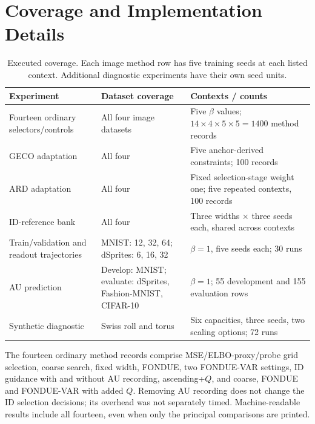\documentclass[make,article,submit,pdftex,moreauthors]{Definitions/mdpi}
\begin{document}
\section{Coverage and Implementation Details}\label{app:coverage}
\begin{table}[H]
\caption{Executed coverage. Each image method row has five training
seeds at each listed context. Additional diagnostic experiments have
their own seed units.}
\label{tab:coverage}\small
\begin{tabularx}{\textwidth}{lXX}\toprule
Experiment & Dataset coverage & Contexts / counts \\\midrule
Fourteen ordinary selectors/controls & All four image datasets & Five $\beta$ values; $14\times4\times5\times5=1400$ method records \\
GECO adaptation & All four & Five anchor-derived constraints; 100 records \\
ARD adaptation & All four & Fixed selection-stage weight one; five repeated contexts, 100 records \\
ID-reference bank & All four & Three widths $\times$ three seeds each, shared across contexts \\
Train/validation and readout trajectories & MNIST: 12, 32, 64; dSprites: 6, 16, 32 & $\beta=1$, five seeds each; 30 runs \\
AU prediction & Develop: MNIST; evaluate: dSprites, Fashion-MNIST, CIFAR-10 & $\beta=1$; 55 development and 155 evaluation rows \\
Synthetic diagnostic & Swiss roll and torus & Six capacities, three seeds, two scaling options; 72 runs \\
\bottomrule\end{tabularx}
\end{table}

The fourteen ordinary method records comprise MSE/ELBO-proxy/probe grid
selection, coarse search, fixed width, FONDUE, two FONDUE-VAR settings,
ID guidance with and without AU recording, ascending+$Q$, and coarse,
FONDUE and FONDUE-VAR with added $Q$. Removing AU recording does not
change the ID selection decisions; its overhead was not separately
timed. Machine-readable results include all fourteen, even when only
the principal comparisons are printed.
\end{document}
